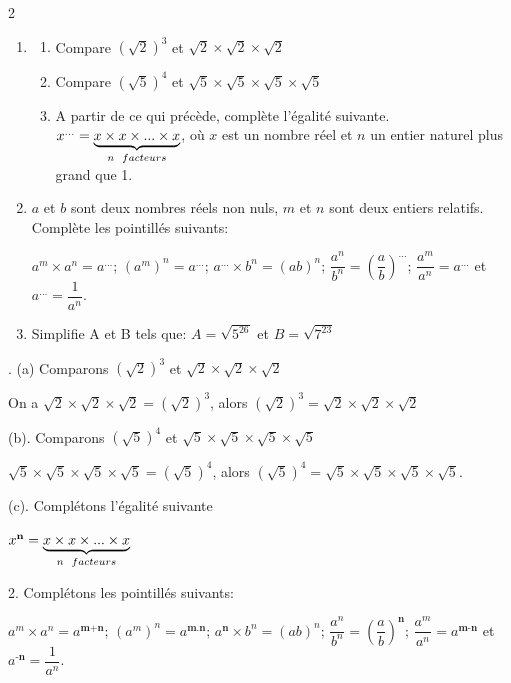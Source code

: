 \begin{multicols*}{2}
  	\begin{enumerate}
  		\item 
  		\begin{enumerate}
  			\item  Compare $ \left(\sqrt{2}\right)^3$ et $\sqrt{2}\times \sqrt{2} \times \sqrt{2}$
  			\item  Compare $\left(\sqrt{5}\right)^4$ et $\sqrt{5}\times \sqrt{5} \times \sqrt{5}\times \sqrt{5}$
  			\item A partir de ce qui précède, complète l'égalité suivante.
  			$x^{...}= \underbrace{x\times x\times...\times x}_{n \hspace{0.2cm}facteurs}$, où $x$ est un nombre réel et $n$ un entier naturel plus grand que 1.	
  		\end{enumerate}
  		\item $a$ et $b$ sont deux nombres réels non nuls, $m$ et $n$ sont deux entiers relatifs. Complète les pointillés suivants:	
  		
  		$a^m\times a^n= a^{...}$; $(a^m)^n=a^{...}$; $a^{...}\times b^{n}= (ab)^n$; $\dfrac{a^n}{b^n}= \left(\dfrac{a}{b}\right)^{...}$;  $\dfrac{a^m}{a^n}=a^{...}$ et $a^{...}=\dfrac{1}{a^n}$.
  		\item Simplifie A et B tels que: 
  		$A=\sqrt{5^{26}}$ et $B=\sqrt{7^{23}}$
  	\end{enumerate}	
  	\dure
  	. (a) Comparons $ \left(\sqrt{2}\right)^3$ et $\sqrt{2}\times \sqrt{2} \times \sqrt{2}$
  	
  	On a $\sqrt{2}\times \sqrt{2} \times \sqrt{2}=\left(\sqrt{2}\right)^3$, alors  $ \left(\sqrt{2}\right)^3=\sqrt{2}\times \sqrt{2} \times \sqrt{2}$ 
  	
  	(b). Comparons $\left(\sqrt{5}\right)^4$ et $\sqrt{5}\times \sqrt{5} \times \sqrt{5}\times \sqrt{5}$
  	
  	$\sqrt{5}\times \sqrt{5} \times \sqrt{5}\times \sqrt{5}= \left(\sqrt{5}\right)^4$, alors $\left(\sqrt{5}\right)^4=\sqrt{5}\times \sqrt{5} \times \sqrt{5}\times \sqrt{5}$.
  	
  	(c). Complétons l'égalité suivante
  	
  	$x^{\textbf{n}}= \underbrace{x\times x\times...\times x}_{n \hspace{0.2cm}facteurs}$
  	
  	2. Complétons les pointillés suivants:	
  	
  	$a^m\times a^n= a^{\textbf{m+n}}$; $(a^m)^n=a^{\textbf{m.n}}$; $a^{\textbf{n}}\times b^{n}= (ab)^n$; $\dfrac{a^n}{b^n}= \left(\dfrac{a}{b}\right)^{\textbf{n}}$;  $\dfrac{a^m}{a^n}=a^{\textbf{m-n}}$ et $a^{\textbf{-n}}=\dfrac{1}{a^n}$.
  	

\end{multicols*}
